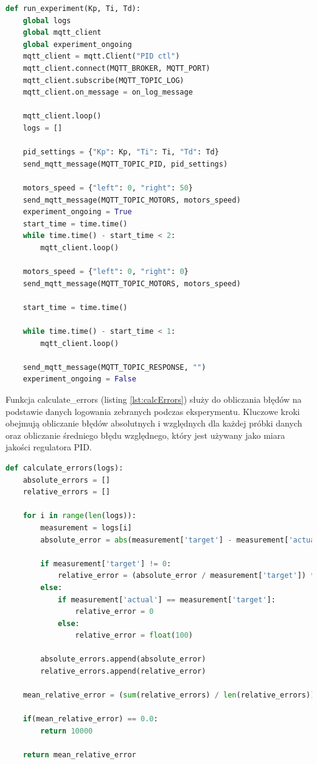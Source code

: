 \documentclass[12pt,twoside]{article}
\begin{document}
\begin{lstlisting}[language=Python, caption=Funkcja uruchamiająca eksperyment, label={lst:runExperiment}]
def run_experiment(Kp, Ti, Td):
    global logs
    global mqtt_client
    global experiment_ongoing
    mqtt_client = mqtt.Client("PID ctl")
    mqtt_client.connect(MQTT_BROKER, MQTT_PORT)
    mqtt_client.subscribe(MQTT_TOPIC_LOG)
    mqtt_client.on_message = on_log_message

    mqtt_client.loop()
    logs = []

    pid_settings = {"Kp": Kp, "Ti": Ti, "Td": Td}
    send_mqtt_message(MQTT_TOPIC_PID, pid_settings)

    motors_speed = {"left": 0, "right": 50}
    send_mqtt_message(MQTT_TOPIC_MOTORS, motors_speed)
    experiment_ongoing = True
    start_time = time.time()
    while time.time() - start_time < 2:
        mqtt_client.loop()

    motors_speed = {"left": 0, "right": 0}
    send_mqtt_message(MQTT_TOPIC_MOTORS, motors_speed)

    start_time = time.time()

    while time.time() - start_time < 1:
        mqtt_client.loop()
    
    send_mqtt_message(MQTT_TOPIC_RESPONSE, "")
    experiment_ongoing = False
\end{lstlisting}

Funkcja calculate\_errors (listing \ref{lst:calcErrors}) służy do obliczania błędów na podstawie danych logowania zebranych podczas eksperymentu. Kluczowe kroki obejmują obliczanie błędów absolutnych i względnych dla każdej próbki danych oraz obliczanie średniego błędu względnego, który jest używany jako miara jakości regulatora PID.

\begin{lstlisting}[language=Python, caption=Funkcja obliczająca błędy, label={lst:calcErrors}]
def calculate_errors(logs):
    absolute_errors = []
    relative_errors = []

    for i in range(len(logs)):
        measurement = logs[i]
        absolute_error = abs(measurement['target'] - measurement['actual'])
        
        if measurement['target'] != 0:
            relative_error = (absolute_error / measurement['target']) * 100
        else:
            if measurement['actual'] == measurement['target']:
                relative_error = 0
            else:
                relative_error = float(100)  
        
        absolute_errors.append(absolute_error)
        relative_errors.append(relative_error)

    mean_relative_error = (sum(relative_errors) / len(relative_errors)) if(len(relative_errors)) != 0 else 10000

    if(mean_relative_error) == 0.0:
        return 10000

    return mean_relative_error
\end{lstlisting}
\end{document}
